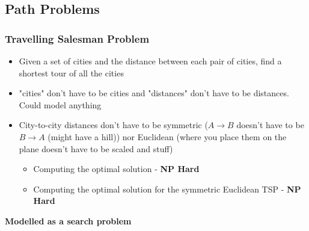 \documentclass{article}[18pt]
\begin{document}
\subsection{Path Problems}
\subsubsection{Travelling Salesman Problem}
\begin{itemize}
	\item Given a set of cities and the distance between each pair of cities, find a shortest tour of all the cities
	\item "cities" don't have to be cities and "distances" don't have to be distances. Could model anything
	\item City-to-city distances don't have to be symmetric ($A\rightarrow B$ doesn't have to be $B\rightarrow A$ (might have a hill)) nor Euclidean (where you place them on the plane doesn't have to be scaled and stuff)
	\begin{itemize}
		\item Computing the optimal solution - \textbf{NP Hard}
		\item Computing the optimal solution for the symmetric Euclidean TSP - \textbf{NP Hard}
	\end{itemize} 
\end{itemize}
\textbf{Modelled as a search problem}
\end{document}
